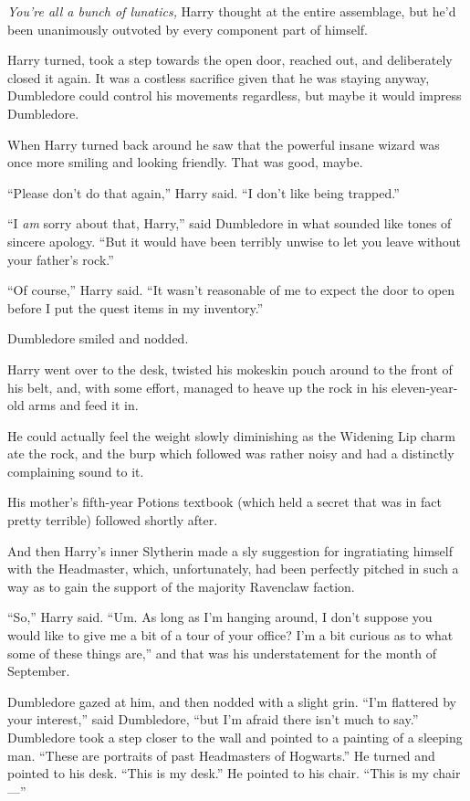 \emph{You're all a bunch of lunatics,} Harry thought at the entire
assemblage, but he'd been unanimously outvoted by every component part
of himself.

Harry turned, took a step towards the open door, reached out, and
deliberately closed it again. It was a costless sacrifice given that he
was staying anyway, Dumbledore could control his movements regardless,
but maybe it would impress Dumbledore.

When Harry turned back around he saw that the powerful insane wizard was
once more smiling and looking friendly. That was good, maybe.

``Please don't do that again,'' Harry said. ``I don't like being
trapped.''

``I \emph{am} sorry about that, Harry,'' said Dumbledore in what sounded
like tones of sincere apology. ``But it would have been terribly unwise
to let you leave without your father's rock.''

``Of course,'' Harry said. ``It wasn't reasonable of me to expect the
door to open before I put the quest items in my inventory.''

Dumbledore smiled and nodded.

Harry went over to the desk, twisted his mokeskin pouch around to the
front of his belt, and, with some effort, managed to heave up the rock
in his eleven-year-old arms and feed it in.

He could actually feel the weight slowly diminishing as the Widening Lip
charm ate the rock, and the burp which followed was rather noisy and had
a distinctly complaining sound to it.

His mother's fifth-year Potions textbook (which held a secret that was
in fact pretty terrible) followed shortly after.

And then Harry's inner Slytherin made a sly suggestion for ingratiating
himself with the Headmaster, which, unfortunately, had been perfectly
pitched in such a way as to gain the support of the majority Ravenclaw
faction.

``So,'' Harry said. ``Um. As long as I'm hanging around, I don't suppose
you would like to give me a bit of a tour of your office? I'm a bit
curious as to what some of these things are,'' and that was his
understatement for the month of September.

Dumbledore gazed at him, and then nodded with a slight grin. ``I'm
flattered by your interest,'' said Dumbledore, ``but I'm afraid there
isn't much to say.'' Dumbledore took a step closer to the wall and
pointed to a painting of a sleeping man. ``These are portraits of past
Headmasters of Hogwarts.'' He turned and pointed to his desk. ``This is
my desk.'' He pointed to his chair. ``This is my chair---''

